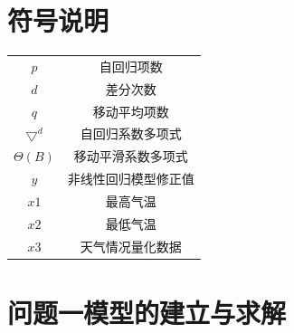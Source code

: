 \documentclass{whutmod}
\begin{document}
	
	\section{符号说明}
	\begin{center}
		\begin{tabular}{cc}
			\hline
			\makebox[0.3\textwidth][c]{符号}	&  \makebox[0.4\textwidth][c]{意义} \\ \hline
			$p$	    & 自回归项数 \\ \hline
			$d$	    & 差分次数\\ \hline
			$q$	    & 移动平均项数 \\ \hline
		$\bigtriangledown ^{d}$ & 自回归系数多项式\\ \hline
		$\Theta (B)$ & 移动平滑系数多项式\\ \hline
			$y$	    & 非线性回归模型修正值  \\ \hline
		    $x1$	    & 最高气温 \\ \hline
		    		$x2$	    & 最低气温  \\ \hline
		    				$x3$	    & 天气情况量化数据 \\ \hline
		\end{tabular}
	\end{center}
	
	\section{问题一模型的建立与求解}
\end{document}
